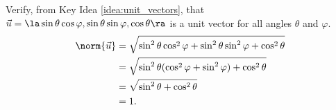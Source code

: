 {Verify, from Key Idea \ref{idea:unit_vectors}, that $\vec u=\la \sin\theta\cos\varphi,\sin\theta\sin\varphi,\cos\theta\ra$ is a unit vector for all angles $\theta$ and $\varphi$.
}
{\begin{align*}
\norm{\vec u} &= \sqrt{\sin^2\theta\cos^2\varphi+\sin^2\theta\sin^2\varphi+\cos^2\theta}\\
						&= \sqrt{\sin^2\theta(\cos^2\varphi+\sin^2\varphi)+\cos^2\theta}\\
						&= \sqrt{\sin^2\theta+\cos^2\theta}\\
						&=1.
\end{align*}
}
